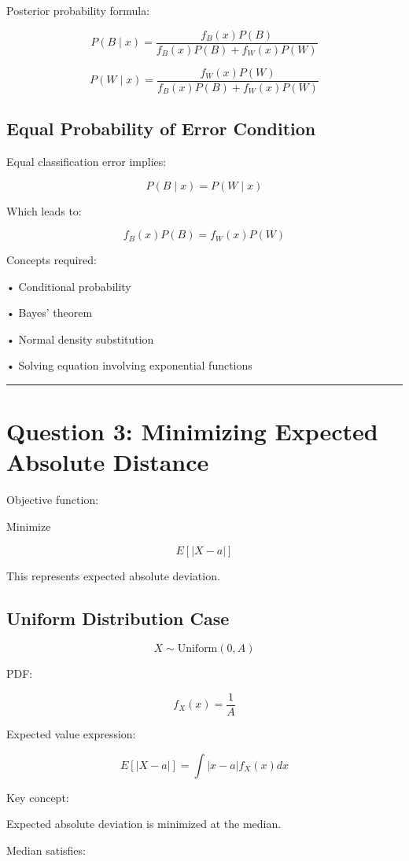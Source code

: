 \documentclass[12pt]{article}
\begin{document}
Posterior probability formula:

\[
P(B \mid x)
=
\frac{ f_B(x) P(B) }
{ f_B(x)P(B) + f_W(x)P(W) }
\]

\[
P(W \mid x)
=
\frac{ f_W(x) P(W) }
{ f_B(x)P(B) + f_W(x)P(W) }
\]

\subsection*{Equal Probability of Error Condition}

Equal classification error implies:

\[
P(B \mid x) = P(W \mid x)
\]

Which leads to:

\[
f_B(x) P(B) = f_W(x) P(W)
\]

Concepts required:

• Conditional probability

• Bayes' theorem

• Normal density substitution

• Solving equation involving exponential functions

\vspace{0.5cm}
\hrule
\vspace{0.5cm}

\section*{Question 3: Minimizing Expected Absolute Distance}

Objective function:

Minimize

\[
E[ |X − a| ]
\]

This represents expected absolute deviation.

\subsection*{Uniform Distribution Case}

\[
X \sim \text{Uniform}(0, A)
\]

PDF:

\[
f_X(x) = \frac{1}{A}
\]

Expected value expression:

\[
E[ |X − a| ] = \int |x − a| f_X(x) dx
\]

Key concept:

Expected absolute deviation is minimized at the median.

Median satisfies:
\end{document}
